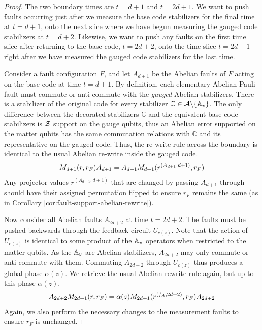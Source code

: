 \documentclass[11pt]{article}
\begin{document}
\begin{proof}
    The two boundary times are $t = d+1$ and $t = 2d +1$. We want to push faults occurring just after we measure the base code stabilizers for the final time at $t=d+1$, onto the next slice where we have begun measuring the gauged code stabilizers at $t = d+2$. Likewise, we want to push any faults on the first time slice after returning to the base code, $t = 2d+2$, onto the time slice $t = 2d+1$ right after we have measured the gauged code stabilizers for the last time.

    Consider a fault configuration $F$, and let $A_{d+1}$ be the Abelian faults of $F$ acting on the base code at time $t=d+1$. By definition, each elementary Abelian Pauli fault must commute or anti-commute with the \emph{gauged} Abelian stabilizers. There is a stabilizer of the original code for every stabilizer $\mathbb{C} \in \mathcal{A} \backslash \{\mathbb{A}_v\}$. The only difference between the decorated stabilizers $\mathbb{C}$ and the equivalent base code stabilizers is $\mathcal{Z}$ support on the gauge qubits, thus an Abelian error supported on the matter qubits has the same commutation relations with $\mathbb{C}$ and its representative on the gauged code. Thus, the re-write rule across the boundary is identical to the usual Abelian re-write inside the gauged code.
    \begin{align}
        M_{d+1}(r, r_F) A_{d+1} = A_{d+1} M_{d+1}(r^{(A_{d+1}, d+1)}, r_F) \notag
    \end{align}
    Any projector values $r^{(A_{d+1}, d+1)}$ that are changed by passing $A_{d+1}$ through should have their assigned permutation flipped to ensure $r_F$ remains the same (as in Corollary \ref{cor:fault-support-abelian-rewrite}).
    
    Now consider all Abelian faults $A_{2d+2}$ at time $t = 2d+2$. The faults must be pushed backwards through the feedback circuit $U_{c(z)}$. Note that the action of $U_{c(z)}$ is identical to some product of the $\mathbb{A}_v$ operators when restricted to the matter qubits. As the $\mathbb{A}_v$ are Abelian stabilizers, $A_{2d+2}$ may only commute or anti-commute with them. Commuting $A_{2d+2}$ through $U_{c(z)}$ thus produces a global phase $\alpha(z)$. We retrieve the usual Abelian rewrite rule again, but up to this phase $\alpha(z)$.
    \begin{align}
        A_{2d+2} M_{2d+1}(r, r_F) = \alpha(z) M_{2d+1}(r^{(f_A, 2d+2)}, r_F) A_{2d+2} \notag 
    \end{align}
    Again, we also perform the necessary changes to the measurement faults to ensure $r_F$ is unchanged.


\end{proof}
\end{document}
